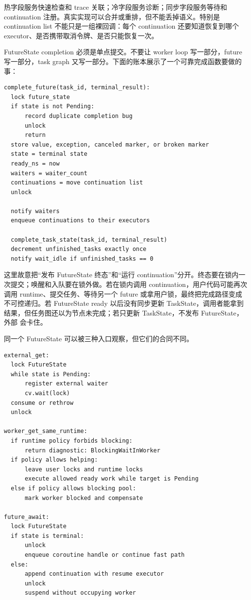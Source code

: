 热字段服务快速检查和 trace 关联；冷字段服务诊断；同步字段服务等待和 continuation 注册。真实实现可以合并或重排，但不能丢掉语义。特别是 continuation list 不能只是一组裸回调：每个 continuation 还要知道恢复到哪个 executor、是否携带取消令牌、是否只能恢复一次。

FutureState completion 必须是单点提交。不要让 worker loop 写一部分，future 写一部分，task graph 又写一部分。下面的账本展示了一个可靠完成函数要做的事：

\begin{lstlisting}[numbers=none,caption={complete\_future 的提交边界}]
complete_future(task_id, terminal_result):
  lock future_state
  if state is not Pending:
      record duplicate completion bug
      unlock
      return
  store value, exception, canceled marker, or broken marker
  state = terminal state
  ready_ns = now
  waiters = waiter_count
  continuations = move continuation list
  unlock

  notify waiters
  enqueue continuations to their executors

  complete_task_state(task_id, terminal_result)
  decrement unfinished_tasks exactly once
  notify wait_idle if unfinished_tasks == 0
\end{lstlisting}

这里故意把“发布 FutureState 终态”和“运行 continuation”分开。终态要在锁内一次提交；唤醒和入队要在锁外做。若在锁内调用 continuation，用户代码可能再次调用 runtime、提交任务、等待另一个 future 或拿用户锁，最终把完成路径变成不可控递归。若 FutureState ready 以后没有同步更新 TaskState，调用者能拿到结果，但任务图还以为节点未完成；若只更新 TaskState，不发布 FutureState，外部  会卡住。

同一个 FutureState 可以被三种入口观察，但它们的合同不同。

\begin{lstlisting}[numbers=none,caption={三种等待入口的伪代码}]
external_get:
  lock FutureState
  while state is Pending:
      register external waiter
      cv.wait(lock)
  consume or rethrow
  unlock

worker_get_same_runtime:
  if runtime policy forbids blocking:
      return diagnostic: BlockingWaitInWorker
  if policy allows helping:
      leave user locks and runtime locks
      execute allowed ready work while target is Pending
  else if policy allows blocking pool:
      mark worker blocked and compensate

future_await:
  lock FutureState
  if state is terminal:
      unlock
      enqueue coroutine handle or continue fast path
  else:
      append continuation with resume executor
      unlock
      suspend without occupying worker
\end{lstlisting}

